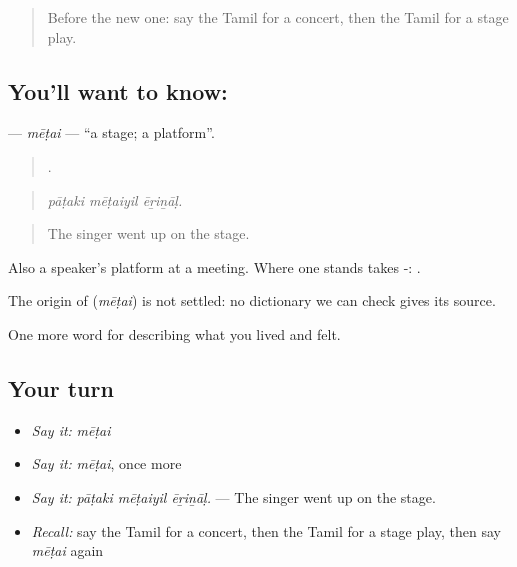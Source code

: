 \label{lesson:TA-C540-metai}



\begin{quote}
Before the new one: say the Tamil for a concert, then the Tamil for a stage play.
\end{quote}

\subsection*{You'll want to know: }
\textbf{} — \emph{mēṭai} — \textquotedblleft{}a stage; a platform\textquotedblright{}.

\begin{quote}
  .
\end{quote}

\begin{quote}
\emph{pāṭaki mēṭaiyil ēṟiṉāḷ.}
\end{quote}

\begin{quote}
The singer went up on the stage.
\end{quote}

Also a speaker's platform at a meeting. Where one stands takes -: .

\begin{cousinweb}
The origin of \textbf{} (\emph{mēṭai}) is not settled: no dictionary we can check gives its source.
\end{cousinweb}

\begin{grammarlens}[title={What you've built}]
One more word for describing what you lived and felt.
\end{grammarlens}

\subsection*{Your turn}
\begin{itemize}
\raggedright
  \item \emph{Say it:} \emph{mēṭai}
  \item \emph{Say it:} \emph{mēṭai}, once more
  \item \emph{Say it:} \emph{pāṭaki mēṭaiyil ēṟiṉāḷ.} — The singer went up on the stage.
  \item \emph{Recall:} say the Tamil for a concert, then the Tamil for a stage play, then say \emph{mēṭai} again
\end{itemize}

